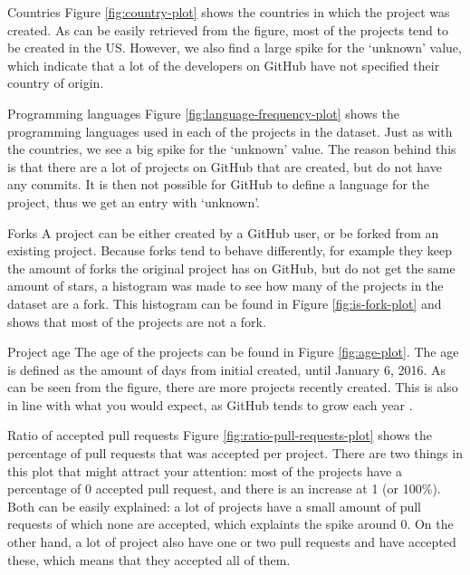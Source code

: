     	\begin{LaTeXdescription}
    	\item[Countries]
    	Figure \ref{fig:country-plot} shows the countries in which the project was created.
    	As can be easily retrieved from the figure, most of the projects tend to be created in the US.
    	However, we also find a large spike for the `unknown' value, which indicate that a lot of the developers on GitHub have not specified their country of origin.
    	\item[Programming languages]
    	Figure \ref{fig:language-frequency-plot} shows the programming languages used in each of the projects in the dataset.
    	Just as with the countries, we see a big spike for the `unknown' value.
    	The reason behind this is that there are a lot of projects on GitHub that are created, but do not have any commits.
    	It is then not possible for GitHub to define a language for the project, thus we get an entry with `unknown'.
    	\item[Forks]
    	A project can be either created by a GitHub user, or be forked from an existing project.
    	Because forks tend to behave differently, for example they keep the amount of forks the original project has on GitHub, but do not get the same amount of stars, a histogram was made to see how many of the projects in the dataset are a fork.
    	This histogram can be found in Figure \ref{fig:is-fork-plot} and shows that most of the projects are not a fork.
    	\item[Project age]
    	The age of the projects can be found in Figure \ref{fig:age-plot}.
    	The age is defined as the amount of days from initial created, until January 6, 2016.
    	As can be seen from the figure, there are more projects recently created.
    	This is also in line with what you would expect, as GitHub tends to grow each year .
    	\item[Ratio of accepted pull requests]
    	Figure \ref{fig:ratio-pull-requests-plot} shows the percentage of pull requests that was accepted per project.
    	There are two things in this plot that might attract your attention: most of the projects have a percentage of 0 accepted pull request, and there is an increase at 1 (or 100\%). 
    	Both can be easily explained: a lot of projects have a small amount of pull requests of which none are accepted, which explaints the spike around 0.
    	On the other hand, a lot of project also have one or two pull requests and have accepted these, which means that they accepted all of them.

\end{LaTeXdescription}
